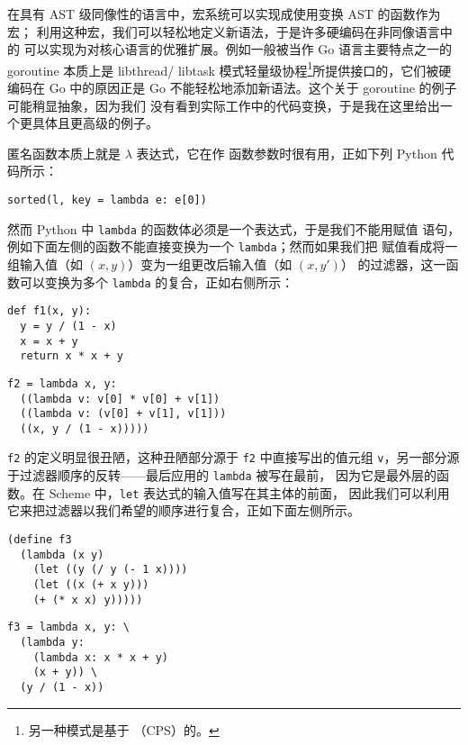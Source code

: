 在具有 AST 级同像性的语言中，宏系统可以实现成使用变换 AST 的函数作为宏；
利用这种宏，我们可以轻松地定义新语法，于是许多硬编码在非同像语言中的%
可以实现为对核心语言的优雅扩展。例如一般被当作 Go
语言主要特点之一的 goroutine 本质上是 libthread/%
libtask 模式轻量级协程\footnote{\label{fn:cps}%
另一种模式是基于%
（CPS）的。}所提供接口的，它们被硬编码在 Go 中的原因正是
Go 不能轻松地添加新语法。这个关于 goroutine 的例子可能稍显抽象，因为我们
没有看到实际工作中的代码变换，于是我在这里给出一个更具体且更高级的例子。

匿名函数本质上就是 $\lambda$ 表达式，它在作
函数参数时很有用，正如下列 Python 代码所示：
\begin{quoting}
\begin{Verbatim}
sorted(l, key = lambda e: e[0])
\end{Verbatim}
\end{quoting}
然而 Python 中 \verb|lambda| 的函数体必须是一个表达式，于是我们不能用赋值
语句，例如下面左侧的函数不能直接变换为一个 \verb|lambda|；然而如果我们把
赋值看成将一组输入值（如 $(x, y)$）变为一组更改后输入值（如 $(x, y')$）
的过滤器，这一函数可以变换为多个 \verb|lambda| 的复合，正如右侧所示：
\colskipa\begin{multicols}{2}
\begin{quoting}
\begin{Verbatim}
def f1(x, y):
  y = y / (1 - x)
  x = x + y
  return x * x + y
\end{Verbatim}
\end{quoting}
\begin{quoting}
\begin{Verbatim}
f2 = lambda x, y:
  ((lambda v: v[0] * v[0] + v[1])
  ((lambda v: (v[0] + v[1], v[1]))
  ((x, y / (1 - x)))))
\end{Verbatim}
\end{quoting}
\end{multicols}\colskipb\noindent%
\verb|f2| 的定义明显很丑陋，这种丑陋部分源于 \verb|f2| 中直接写出的值元组
\verb|v|，另一部分源于过滤器顺序的反转——最后应用的 \verb|lambda| 被写在最前，
因为它是最外层的函数。在 Scheme 中，\verb|let| 表达式的输入值写在其主体的前面，
因此我们可以利用它来把过滤器以我们希望的顺序进行复合，正如下面左侧所示。
\colskipa\begin{multicols}{2}
\begin{quoting}
\begin{Verbatim}
(define f3
  (lambda (x y)
    (let ((y (/ y (- 1 x))))
    (let ((x (+ x y)))
    (+ (* x x) y)))))
\end{Verbatim}
\end{quoting}
\begin{quoting}
\begin{Verbatim}
f3 = lambda x, y: \
  (lambda y:
    (lambda x: x * x + y)
    (x + y)) \
  (y / (1 - x))
\end{Verbatim}
\end{quoting}
\end{multicols}\colskipb\noindent%
